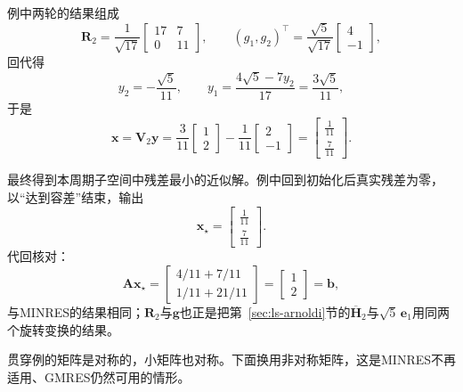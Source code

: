 例中两轮的结果组成
\[
 \bm R_2=\frac1{\sqrt{17}}\begin{bmatrix}17&7\\0&11\end{bmatrix},\qquad
 (g_1,g_2)^\top=\frac{\sqrt5}{\sqrt{17}}\begin{bmatrix}4\\-1\end{bmatrix},
\]
回代得
\[
 y_2=-\frac{\sqrt5}{11},\qquad y_1=\frac{4\sqrt5-7y_2}{17}=\frac{3\sqrt5}{11},
\]
于是
\[
 \bm x=\bm V_2\bm y=\frac3{11}\begin{bmatrix}1\\2\end{bmatrix}-\frac1{11}\begin{bmatrix}2\\-1\end{bmatrix}=\begin{bmatrix}\tfrac1{11}\\\tfrac7{11}\end{bmatrix}.
\]

最终得到本周期子空间中残差最小的近似解。例中回到初始化后真实残差为零，以“达到容差”结束，输出
\[
 \bm x_\star=\begin{bmatrix}\tfrac1{11}\\\tfrac7{11}\end{bmatrix} .
\]
代回核对：
\[
 \bm A\bm x_\star=\begin{bmatrix}4/11+7/11\\1/11+21/11\end{bmatrix}=\begin{bmatrix}1\\2\end{bmatrix}=\bm b ,
\]
与MINRES的结果相同；$\bm R_2$与$\bm g$也正是把第~\ref{sec:ls-arnoldi}节的$\overline{\bm H}_2$与$\sqrt5\,\bm e_1$用同两个旋转变换的结果。

贯穿例的矩阵是对称的，小矩阵也对称。下面换用非对称矩阵，这是MINRES不再适用、GMRES仍然可用的情形。

